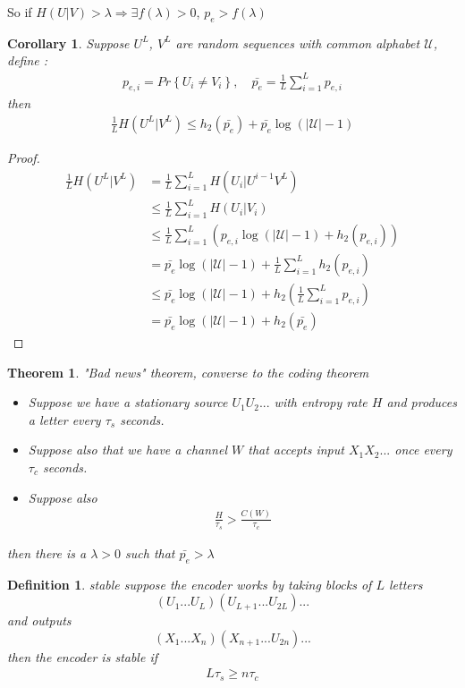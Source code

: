 \documentclass[twoside]{article}
\newtheorem{theorem}{Theorem}[section]
\newtheorem{corollary}{Corollary}[theorem]
\newtheorem{definition}{Definition}[section]
\theoremstyle{definition} %
\renewcommand{\Pr}[1]{Pr\left\{#1\right\}}
\def\U{\mathcal{U}}
\begin{document}
So if $H(U|V) > \lambda \Rightarrow \exists f(\lambda) > 0$, $p_e > f(\lambda)$

\begin{corollary}
  Suppose $U^L$, $V^L$ are random sequences with common alphabet $\U$, define :
  \begin{align*}
    p_{e,i} = \Pr{U_i \neq V_i} , \quad
    \bar{p_e} = \frac{1}{L} \sum_{i = 1}^{L} p_{e,i}
  \end{align*}
  then
  \begin{align*}
    \frac{1}{L} H(U^L | V^L) \leq h_2(\bar{p_e}) + \bar{p_e} \log(|\U| - 1)
  \end{align*}
\end{corollary}

\begin{proof}
  \begin{align*}
    \frac{1}{L} H(U^L | V^L) &= \frac{1}{L} \sum_{i = 1}^{L} H(U_i | U^{i-1} V^L) \\
    &\leq \frac{1}{L} \sum_{i = 1}^{L} H(U_i | V_i) \\
    &\leq \frac{1}{L} \sum_{i = 1}^{L}(p_{e,i} \log(|\U| - 1) + h_2(p_{e, i})) \\
    &= \bar{p_e} \log(|\U| - 1) + \frac{1}{L} \sum_{i = 1}^L h_2(p_{e,i}) \\
    &\leq \bar{p_e} \log(|\U| - 1) + h_2(\frac{1}{L} \sum_{i = 1}^L p_{e,i}) \\
    &= \bar{p_e} \log(|\U| - 1) + h_2(\bar{p_e})
  \end{align*}
\end{proof}

\begin{theorem}{"Bad news" theorem, converse to the coding theorem}
  \begin{itemize}
    \item Suppose we have a stationary source $U_1 U_2 ...$ with entropy rate $H$ and produces a letter every $\tau_s$ seconds.
    \item Suppose also that we have a channel $W$ that accepts input $X_1 X_2 ...$ once every $\tau_c$ seconds.
    \item Suppose also
    \begin{align*}
      \frac{H}{\tau_s} > \frac{C(W)}{\tau_c}
    \end{align*}
  \end{itemize}
  then there is a $\lambda > 0$ such that $\bar{p_e} > \lambda$
\end{theorem}

\begin{definition}{stable}
  suppose the encoder works by taking blocks of $L$ letters
  $$(U_1 ... U_L)(U_{L+1} ... U_{2L})...$$
  and outputs
  $$(X_1 ... X_n)(X_{n+1} ... U_{2n})...$$
  then the encoder is stable if
  \begin{align*}
    L \tau_s \geq n \tau_c
  \end{align*}
\end{definition}
\end{document}
